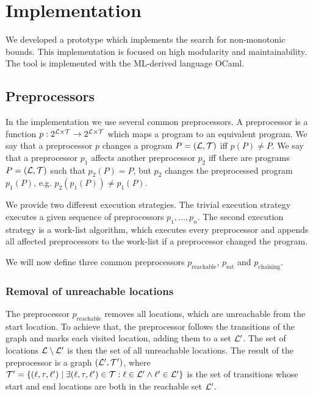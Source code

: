 \section{Implementation}

We developed a prototype which implements the search for non-monotonic bounds.
This implementation is focused on high modularity and maintainability.
The tool is implemented with the ML-derived language OCaml.

\subsection{Preprocessors}

In the implementation we use several common preprocessors.
A preprocessor is a function $p: 2^{\mathcal{L} \times \mathcal{T}} \rightarrow 2^{\mathcal{L} \times \mathcal{T}}$ which maps a program to an equivalent program.
We say that a preprocessor $p$ changes a program $P = (\mathcal{L}, \mathcal{T})$ iff $p(P) \neq P$.
We say that a preprocessor $p_1$ affects another preprocessor $p_2$ iff there are programs $P = (\mathcal{L}, \mathcal{T})$ such that $p_2(P) = P$, but $p_2$ changes the preprocessed program $p_1(P)$, e.g. $p_2(p_1(P)) \neq p_1(P)$.

We provide two different execution strategies.
The trivial execution strategy executes a given sequence of preprocessors $p_1, \dots, p_n$.
The second execution strategy is a work-list algorithm, which executes every preprocessor and appends all affected preprocessors to the work-list if a preprocessor changed the program.

We will now define three common preprocessors $p_{\text{reachable}}$, $p_{\text{sat}}$ and $p_{\text{chaining}}$.

\subsubsection{Removal of unreachable locations}

The preprocessor $p_{\text{reachable}}$ removes all locations, which are unreachable from the start location.
To achieve that, the preprocessor follows the transitions of the graph and marks each visited location, adding them to a set $\mathcal{L}'$.
The set of locations $\mathcal{L} \setminus \mathcal{L}'$ is then the set of all unreachable locations.
The result of the preprocessor is a graph $(\mathcal{L}', \mathcal{T}')$, where $\mathcal{T}' = \lbrace (\ell,\tau,\ell') \mid \exists (\ell,\tau,\ell') \in \mathcal{T}: \ell \in \mathcal{L}' \wedge \ell' \in \mathcal{L}' \rbrace$ is the set of transitions whose start and end locations are both in the reachable set $\mathcal{L}'$.

